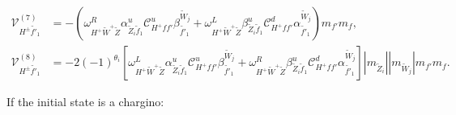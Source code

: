 \documentclass[final,3p,times,pdflatex]{elsarticle}
\begin{document}
\begin{align}
\mathcal{V}_{H^{\pm} \tilde{f'}_1}^{(7)} &= -(\omega_{H^+ \tilde{W}^+ \tilde{Z}}^R \alpha_{\tilde{Z}_i \tilde{f}_1}^{u} \mathcal{C}_{H^+ f f'}^u \beta_{\tilde{f'}_1}^{\tilde{W}_j} + \omega_{H^+ \tilde{W}^+ \tilde{Z}}^L  \beta_{\tilde{Z}_i \tilde{f}_1}^{u} \mathcal{C}_{H^+ f f'}^d \alpha_{\tilde{f'}_1}^{\tilde{W}_j})m_{f'}m_{f},
\\
\mathcal{V}_{H^{\pm} \tilde{f'}_1}^{(8)} &= -2(-1)^{\theta_i}[\omega_{H^+ \tilde{W}^+ \tilde{Z}}^L \alpha_{\tilde{Z}_i \tilde{f}_1}^{u} \mathcal{C}_{H^+ f f'}^u \beta_{\tilde{f'}_1}^{\tilde{W}_j} + \omega_{H^+ \tilde{W}^+ \tilde{Z}}^R \beta_{\tilde{Z}_i \tilde{f}_1}^{u} \mathcal{C}_{H^+ f f'}^d \alpha_{\tilde{f'}_1}^{\tilde{W}_j}]|m_{\tilde{Z}_i}||m_{\tilde{W}_j}|m_{f'}m_{f}.
\end{align}

If the initial state is a chargino:
\end{document}

